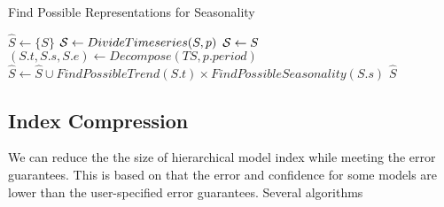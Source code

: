 \documentclass[10pt,conference,letterpaper]{IEEEtran}
\begin{document}
\begin{algorithm}[tp]
\caption{Find Possible Representations for Seasonality}
\label{alg:s}
\begin{algorithmic}[1]
\State $\hat{S} \gets  \{S\}$ \label{algs:s0}
 \label{algs:s1}
\State ${\cal S}\gets                DivideTimeseries(S,p)$
\Else 
\State ${\cal S} \gets S$
\EndIf\label{algs:s2}
     \label{algs:s3}
\State $(S.t,S.s,S.e) \gets Decompose (TS, p.period)$
\State $\hat{S} \gets \hat{S} \cup FindPossibleTrend(S.t) \times FindPossibleSeasonality(S.s)$
\EndFor \label{algs:s4}
\EndFor
{} $\hat{S}$
\EndProcedure
\end{algorithmic}
\end{algorithm}


\subsection{Index Compression}
We can reduce the the size of hierarchical model index while meeting the error guarantees. This is based on that  the error and confidence for some models are  lower than  the user-specified error guarantees. Several algorithms 
\end{document}
